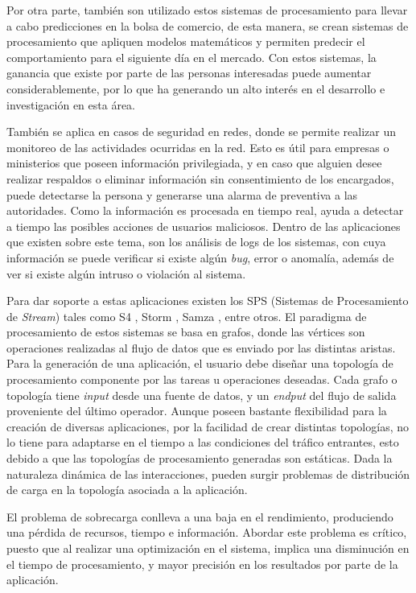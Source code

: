 Por otra parte, también son utilizado estos sistemas de procesamiento para llevar a cabo predicciones en la bolsa de comercio, de esta manera, se crean sistemas de procesamiento que apliquen modelos matemáticos y permiten predecir el comportamiento para el siguiente día en el mercado. Con estos sistemas, la ganancia que existe por parte de las personas interesadas puede aumentar considerablemente, por lo que ha generando un alto interés en el desarrollo e investigación en esta área.

También se aplica en casos de seguridad en redes, donde se permite realizar un monitoreo de las actividades ocurridas en la red. Esto es útil para empresas o ministerios que poseen información privilegiada, y en caso que alguien desee realizar respaldos o eliminar información sin consentimiento de los encargados, puede detectarse la persona y generarse una alarma de preventiva a las autoridades. Como la información es procesada en tiempo real, ayuda a detectar a tiempo las posibles acciones de usuarios maliciosos. Dentro de las aplicaciones que existen sobre este tema, son los análisis de logs de los sistemas, con cuya información se puede verificar si existe algún \textit{bug}, error o anomalía, además de ver si existe algún intruso o violación al sistema.

Para dar soporte a estas aplicaciones existen los SPS (Sistemas de Procesamiento de \textit{Stream}) tales como S4 \citep{s4yahoo}, Storm \citep{stormtwitter}, Samza \citep{samza}, entre otros. El paradigma de procesamiento de estos sistemas se basa en grafos, donde las vértices son operaciones realizadas al flujo de datos que es enviado por las distintas aristas. Para la generación de una aplicación, el usuario debe diseñar una topología de procesamiento componente por las tareas u operaciones deseadas. Cada grafo o topología tiene \textit{input} desde una fuente de datos, y un \textit{endput} del flujo de salida proveniente del último operador. Aunque poseen bastante flexibilidad para la creación de diversas aplicaciones, por la facilidad de crear distintas topologías, no lo tiene para adaptarse en el tiempo a las condiciones del tráfico entrantes, esto debido a que las topolog\'ias de procesamiento generadas son est\'aticas. Dada la naturaleza din\'amica de las interacciones, pueden surgir problemas de distribución de carga en la topología asociada a la aplicación.

El problema de sobrecarga conlleva a una baja en el rendimiento, produciendo una pérdida de recursos, tiempo e información. Abordar este problema es crítico, puesto que al realizar una optimización en el sistema, implica una disminución en el tiempo de procesamiento, y mayor precisión en los resultados por parte de la aplicación.

